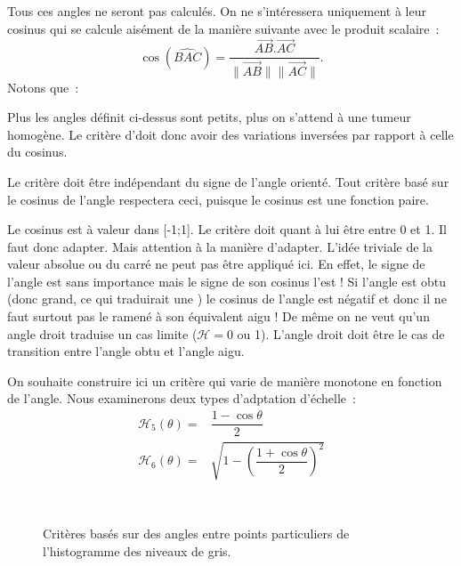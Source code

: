\documentclass[main.tex]{subfiles}
\begin{document}
Tous ces angles ne seront pas calculés. On ne s'intéressera uniquement à leur cosinus qui se calcule aisément de la manière suivante avec le produit scalaire~:
\begin{equation}
\label{eq:cos_prod_scal}
\cos(\widehat{BAC}) = \dfrac{ \overrightarrow{AB}.\overrightarrow{AC} }{ \| \overrightarrow{AB} \| \| \overrightarrow{AC} \|}.
\end{equation}
Notons que~:
\begin{myitemize}
\item Plus les angles définit ci-dessus sont petits, plus on s'attend à une tumeur homogène. Le critère d'\hetero doit donc avoir des variations inversées par rapport à celle du cosinus.
\item Le critère doit être indépendant du signe de l'angle orienté. Tout critère basé sur le cosinus de l'angle respectera ceci, puisque le cosinus est une fonction paire.
\item Le cosinus est à valeur dans [-1;1]. Le critère doit quant à lui être entre 0 et 1. Il faut donc adapter. Mais attention à la manière d'adapter. L'idée triviale de la valeur absolue ou du  carré ne peut pas être appliqué ici. En effet, le signe de l'angle est sans importance mais le signe de son cosinus l'est ! Si l'angle est obtu (donc grand, ce qui traduirait une \hetero) le cosinus de l'angle est négatif et donc il ne faut surtout pas le ramené à son équivalent aigu ! De même on ne veut qu'un angle droit traduise un cas limite ($\mathcal{H} = 0$ ou 1). L'angle droit doit être le cas de transition entre l'angle obtu et l'angle aigu.
\end{myitemize}
On souhaite construire ici un critère qui varie de manière monotone en fonction de l'angle. Nous examinerons deux types d'adptation d'échelle~:
\begin{align}
\mathcal{H}_5 (\theta) = &\dfrac{1-\cos \theta}{2} \\
\mathcal{H}_6 (\theta) = &\sqrt{1-\left(  \dfrac{1+\cos \theta}{2}\right)^2}
\end{align}
\begin{figure}
\ 
\caption{\label{fig:crit_hetero_angle}Critères basés sur des angles entre points particuliers de l'histogramme des niveaux de gris.}
\end{figure}
\end{document}
